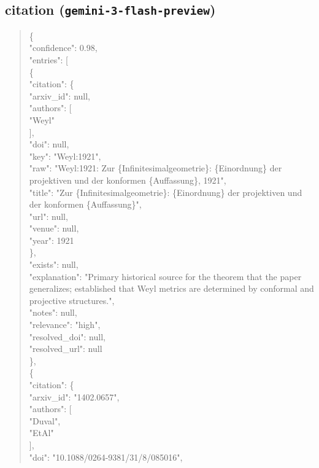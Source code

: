 \documentclass[11pt]{article}
\begin{document}
\subsection*{citation (\texttt{gemini-3-flash-preview})}
\begin{quote}\small\ttfamily\raggedright
\{\\
  "confidence": 0.98,\\
  "entries": [\\
    \{\\
      "citation": \{\\
        "arxiv\_id": null,\\
        "authors": [\\
          "Weyl"\\
        ],\\
        "doi": null,\\
        "key": "Weyl:1921",\\
        "raw": "Weyl:1921: Zur \{Infinitesimalgeometrie\}: \{Einordnung\} der projektiven und der konformen \{Auffassung\}, 1921",\\
        "title": "Zur \{Infinitesimalgeometrie\}: \{Einordnung\} der projektiven und der konformen \{Auffassung\}",\\
        "url": null,\\
        "venue": null,\\
        "year": 1921\\
      \},\\
      "exists": null,\\
      "explanation": "Primary historical source for the theorem that the paper generalizes; established that Weyl metrics are determined by conformal and projective structures.",\\
      "notes": null,\\
      "relevance": "high",\\
      "resolved\_doi": null,\\
      "resolved\_url": null\\
    \},\\
    \{\\
      "citation": \{\\
        "arxiv\_id": "1402.0657",\\
        "authors": [\\
          "Duval",\\
          "EtAl"\\
        ],\\
        "doi": "10.1088/0264-9381/31/8/085016",\\

\end{quote}
\end{document}
